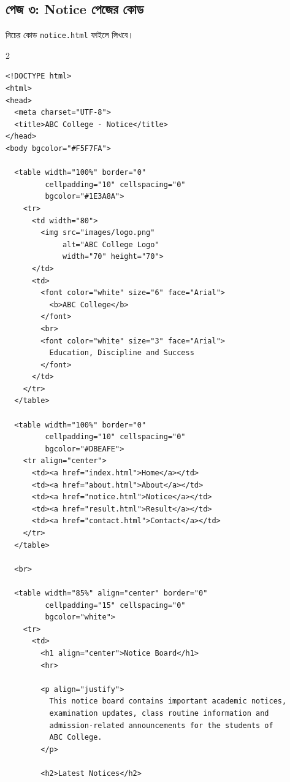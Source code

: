 \subsection{পেজ ৩: Notice পেজের কোড}

নিচের কোড \texttt{notice.html} ফাইলে লিখবে।

\par{}\par
\begin{multicols}{2}
\begin{verbatim}
<!DOCTYPE html>
<html>
<head>
  <meta charset="UTF-8">
  <title>ABC College - Notice</title>
</head>
<body bgcolor="#F5F7FA">

  <table width="100%" border="0"
         cellpadding="10" cellspacing="0"
         bgcolor="#1E3A8A">
    <tr>
      <td width="80">
        <img src="images/logo.png"
             alt="ABC College Logo"
             width="70" height="70">
      </td>
      <td>
        <font color="white" size="6" face="Arial">
          <b>ABC College</b>
        </font>
        <br>
        <font color="white" size="3" face="Arial">
          Education, Discipline and Success
        </font>
      </td>
    </tr>
  </table>

  <table width="100%" border="0"
         cellpadding="10" cellspacing="0"
         bgcolor="#DBEAFE">
    <tr align="center">
      <td><a href="index.html">Home</a></td>
      <td><a href="about.html">About</a></td>
      <td><a href="notice.html">Notice</a></td>
      <td><a href="result.html">Result</a></td>
      <td><a href="contact.html">Contact</a></td>
    </tr>
  </table>

  <br>

  <table width="85%" align="center" border="0"
         cellpadding="15" cellspacing="0"
         bgcolor="white">
    <tr>
      <td>
        <h1 align="center">Notice Board</h1>
        <hr>

        <p align="justify">
          This notice board contains important academic notices,
          examination updates, class routine information and
          admission-related announcements for the students of
          ABC College.
        </p>

        <h2>Latest Notices</h2>


\end{verbatim}
\end{multicols}
